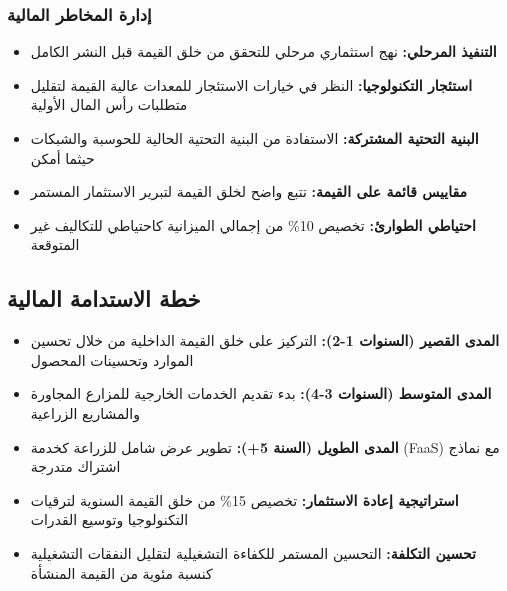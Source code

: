 \subsubsection{إدارة المخاطر المالية}
\begin{itemize}
    \item \textbf{التنفيذ المرحلي:} نهج استثماري مرحلي للتحقق من خلق القيمة قبل النشر الكامل
    
    \item \textbf{استئجار التكنولوجيا:} النظر في خيارات الاستئجار للمعدات عالية القيمة لتقليل متطلبات رأس المال الأولية
    
    \item \textbf{البنية التحتية المشتركة:} الاستفادة من البنية التحتية الحالية للحوسبة والشبكات حيثما أمكن
    
    \item \textbf{مقاييس قائمة على القيمة:} تتبع واضح لخلق القيمة لتبرير الاستثمار المستمر
    
    \item \textbf{احتياطي الطوارئ:} تخصيص 10\% من إجمالي الميزانية كاحتياطي للتكاليف غير المتوقعة
\end{itemize}

\subsection{خطة الاستدامة المالية}
\begin{itemize}
    \item \textbf{المدى القصير (السنوات 1-2):} التركيز على خلق القيمة الداخلية من خلال تحسين الموارد وتحسينات المحصول
    
    \item \textbf{المدى المتوسط (السنوات 3-4):} بدء تقديم الخدمات الخارجية للمزارع المجاورة والمشاريع الزراعية
    
    \item \textbf{المدى الطويل (السنة 5+):} تطوير عرض شامل للزراعة كخدمة (FaaS) مع نماذج اشتراك متدرجة
    
    \item \textbf{استراتيجية إعادة الاستثمار:} تخصيص 15\% من خلق القيمة السنوية لترقيات التكنولوجيا وتوسيع القدرات
    
    \item \textbf{تحسين التكلفة:} التحسين المستمر للكفاءة التشغيلية لتقليل النفقات التشغيلية كنسبة مئوية من القيمة المنشأة
\end{itemize} 